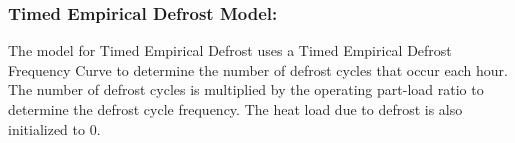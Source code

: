 \subsubsection*{Timed Empirical Defrost Model:}\label{eir-air-to-water-heat-pumps-timed-empirical-defrost}
%
The model for Timed Empirical Defrost uses a Timed Empirical Defrost Frequency Curve to determine the number of defrost cycles that occur each hour. The number of defrost cycles is multiplied by the operating part-load ratio to determine the defrost cycle frequency. The heat load due to defrost is also initialized to 0.

